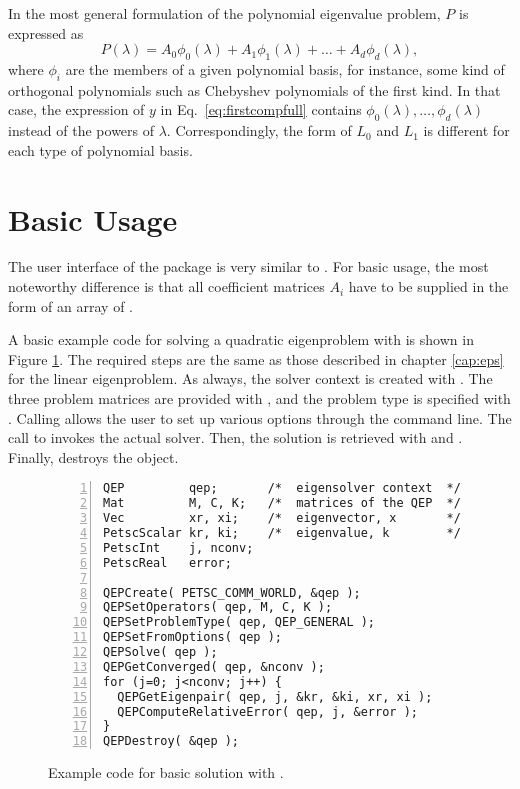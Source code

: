 In the most general formulation of the polynomial eigenvalue problem, $P$ is expressed as
\begin{equation}
\label{eq:pepnonmon}
P(\lambda)=A_0\phi_0(\lambda)+A_1\phi_1(\lambda)+\dots+A_d\phi_d(\lambda),
\end{equation}
where $\phi_i$ are the members of a given polynomial basis, for instance, some kind of orthogonal polynomials such as Chebyshev polynomials of the first kind. In that case, the expression of $y$ in Eq.\ \ref{eq:firstcompfull} contains $\phi_0(\lambda),\dots,\phi_d(\lambda)$ instead of the powers of $\lambda$. Correspondingly, the form of $L_0$ and $L_1$ is different for each type of polynomial basis.

\section{Basic Usage}

The user interface of the  package is very similar to . For basic usage, the most noteworthy difference is that all coefficient matrices $A_i$ have to be supplied in the form of an array of .

A basic example code for solving a quadratic eigenproblem with  is shown in Figure \ref{fig:ex-qep}. The required steps are the same as those described in chapter \ref{cap:eps} for the linear eigenproblem. As always, the solver context is created with . The three problem matrices are provided with , and the problem type is specified with . Calling  allows the user to set up various options through the command line. The call to  invokes the actual solver. Then, the solution is retrieved with  and . Finally,  destroys the object.

\begin{figure}
\begin{Verbatim}[fontsize=\small,numbers=left,numbersep=6pt,xleftmargin=15mm]
QEP         qep;       /*  eigensolver context  */
Mat         M, C, K;   /*  matrices of the QEP  */
Vec         xr, xi;    /*  eigenvector, x       */
PetscScalar kr, ki;    /*  eigenvalue, k        */
PetscInt    j, nconv;
PetscReal   error;

QEPCreate( PETSC_COMM_WORLD, &qep );
QEPSetOperators( qep, M, C, K );
QEPSetProblemType( qep, QEP_GENERAL );
QEPSetFromOptions( qep );
QEPSolve( qep );
QEPGetConverged( qep, &nconv );
for (j=0; j<nconv; j++) {
  QEPGetEigenpair( qep, j, &kr, &ki, xr, xi );
  QEPComputeRelativeError( qep, j, &error );
}
QEPDestroy( &qep );
\end{Verbatim}
\caption{\label{fig:ex-qep}Example code for basic solution with .}
\end{figure}


